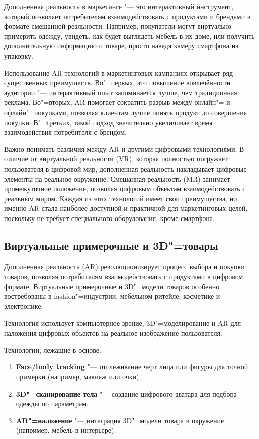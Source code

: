 Дополненная реальность в маркетинге "--- это интерактивный инструмент, который позволяет потребителям взаимодействовать с продуктами и брендами в формате смешанной реальности. Например, покупатели могут виртуально примерить одежду, увидеть, как будет выглядеть мебель в их доме, или получить дополнительную информацию о товаре, просто наведя камеру смартфона на упаковку.

Использование AR-технологий в маркетинговых кампаниях открывает ряд существенных преимуществ. Во"=первых, это повышение вовлечённости аудитории "--- интерактивный опыт запоминается лучше, чем традиционная реклама. Во"=вторых, AR помогает сократить разрыв между онлайн"= и офлайн"=покупками, позволяя клиентам лучше понять продукт до совершения покупки. В"=третьих, такой подход значительно увеличивает время взаимодействия потребителя с брендом.

Важно понимать различия между AR и другими цифровыми технологиями. В отличие от виртуальной реальности (VR), которая полностью погружает пользователя в цифровой мир, дополненная реальность накладывает цифровые элементы на реальное окружение. Смешанная реальность (MR) занимает промежуточное положение, позволяя цифровым объектам взаимодействовать с реальным миром. Каждая из этих технологий имеет свои преимущества, но именно AR стала наиболее доступной и практичной для маркетинговых целей, поскольку не требует специального оборудования, кроме смартфона.

\subsection{Виртуальные примерочные и 3D"=товары}
Дополненная реальность (AR) революционизирует процесс выбора и покупки товаров, позволяя потребителям взаимодействовать с продуктами в цифровом формате. Виртуальные примерочные и 3D"=модели товаров особенно востребованы в fashion"=индустрии, мебельном ритейле, косметике и электронике.

Технология использует компьютерное зрение, 3D"=моделирование и AR для наложения цифровых объектов на реальное изображение пользователя.

Технологии, лежащие в основе:
\begin{enumerate}
    \item \textbf{Face/body tracking} "--- отслеживание черт лица или фигуры для точной примерки (например, макияж или очки).
    \item \textbf{3D"=сканирование тела} "--- создание цифрового аватара для подбора одежды по параметрам.
    \item \textbf{AR"=наложение} "--- интеграция 3D"=модели товара в окружение (например, мебель в интерьере).
\end{enumerate}

